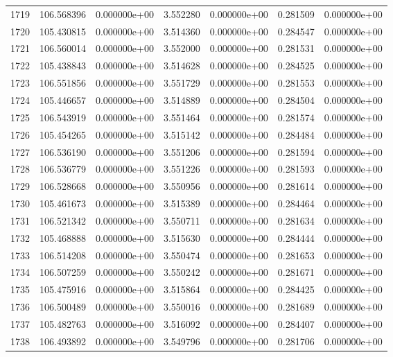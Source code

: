 \begin{tabular}{rrrrrrr}
1719 & 106.568396 &  0.000000e+00 &  3.552280 &  0.000000e+00 &    0.281509 &  0.000000e+00 \\
1720 & 105.430815 &  0.000000e+00 &  3.514360 &  0.000000e+00 &    0.284547 &  0.000000e+00 \\
1721 & 106.560014 &  0.000000e+00 &  3.552000 &  0.000000e+00 &    0.281531 &  0.000000e+00 \\
1722 & 105.438843 &  0.000000e+00 &  3.514628 &  0.000000e+00 &    0.284525 &  0.000000e+00 \\
1723 & 106.551856 &  0.000000e+00 &  3.551729 &  0.000000e+00 &    0.281553 &  0.000000e+00 \\
1724 & 105.446657 &  0.000000e+00 &  3.514889 &  0.000000e+00 &    0.284504 &  0.000000e+00 \\
1725 & 106.543919 &  0.000000e+00 &  3.551464 &  0.000000e+00 &    0.281574 &  0.000000e+00 \\
1726 & 105.454265 &  0.000000e+00 &  3.515142 &  0.000000e+00 &    0.284484 &  0.000000e+00 \\
1727 & 106.536190 &  0.000000e+00 &  3.551206 &  0.000000e+00 &    0.281594 &  0.000000e+00 \\
1728 & 106.536779 &  0.000000e+00 &  3.551226 &  0.000000e+00 &    0.281593 &  0.000000e+00 \\
1729 & 106.528668 &  0.000000e+00 &  3.550956 &  0.000000e+00 &    0.281614 &  0.000000e+00 \\
1730 & 105.461673 &  0.000000e+00 &  3.515389 &  0.000000e+00 &    0.284464 &  0.000000e+00 \\
1731 & 106.521342 &  0.000000e+00 &  3.550711 &  0.000000e+00 &    0.281634 &  0.000000e+00 \\
1732 & 105.468888 &  0.000000e+00 &  3.515630 &  0.000000e+00 &    0.284444 &  0.000000e+00 \\
1733 & 106.514208 &  0.000000e+00 &  3.550474 &  0.000000e+00 &    0.281653 &  0.000000e+00 \\
1734 & 106.507259 &  0.000000e+00 &  3.550242 &  0.000000e+00 &    0.281671 &  0.000000e+00 \\
1735 & 105.475916 &  0.000000e+00 &  3.515864 &  0.000000e+00 &    0.284425 &  0.000000e+00 \\
1736 & 106.500489 &  0.000000e+00 &  3.550016 &  0.000000e+00 &    0.281689 &  0.000000e+00 \\
1737 & 105.482763 &  0.000000e+00 &  3.516092 &  0.000000e+00 &    0.284407 &  0.000000e+00 \\
1738 & 106.493892 &  0.000000e+00 &  3.549796 &  0.000000e+00 &    0.281706 &  0.000000e+00 \\

\end{tabular}
